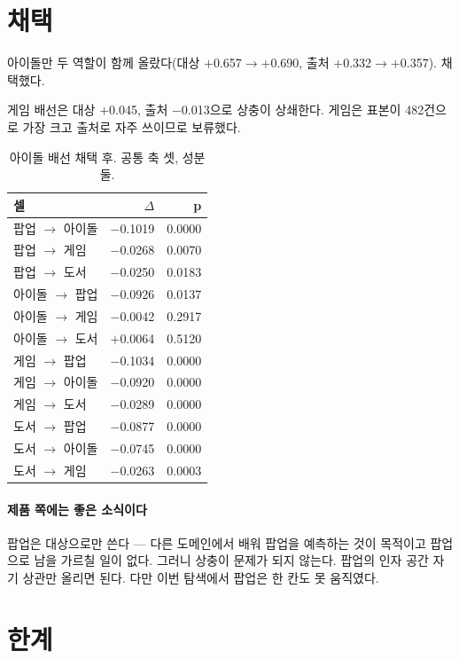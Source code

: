 \documentclass[10pt]{article}
\begin{document}
\section{채택}

아이돌만 두 역할이 함께 올랐다(대상 $+$0.657$\to+$0.690, 출처
$+$0.332$\to+$0.357). 채택했다.

게임 배선은 대상 $+$0.045, 출처 $-$0.013으로 상충이 상쇄한다. 게임은 표본이
482건으로 가장 크고 출처로 자주 쓰이므로 보류했다.

\begin{table}[t]
\centering\tsize
\caption{아이돌 배선 채택 후. 공통 축 셋, 성분 둘.}
\begin{tabular}{lrr}
\toprule
셀 & $\Delta$ & p \\
\midrule
팝업 $\to$ 아이돌 & $-$0.1019 & 0.0000 \\
팝업 $\to$ 게임 & $-$0.0268 & 0.0070 \\
팝업 $\to$ 도서 & $-$0.0250 & 0.0183 \\
아이돌 $\to$ 팝업 & $-$0.0926 & 0.0137 \\
아이돌 $\to$ 게임 & $-$0.0042 & 0.2917 \\
아이돌 $\to$ 도서 & $+$0.0064 & 0.5120 \\
게임 $\to$ 팝업 & $-$0.1034 & 0.0000 \\
게임 $\to$ 아이돌 & $-$0.0920 & 0.0000 \\
게임 $\to$ 도서 & $-$0.0289 & 0.0000 \\
도서 $\to$ 팝업 & $-$0.0877 & 0.0000 \\
도서 $\to$ 아이돌 & $-$0.0745 & 0.0000 \\
도서 $\to$ 게임 & $-$0.0263 & 0.0003 \\
\bottomrule
\end{tabular}
\end{table}

\paragraph{제품 쪽에는 좋은 소식이다}
팝업은 대상으로만 쓴다 --- 다른 도메인에서 배워 팝업을 예측하는 것이 목적이고
팝업으로 남을 가르칠 일이 없다. 그러니 상충이 문제가 되지 않는다. 팝업의 인자
공간 자기 상관만 올리면 된다. 다만 이번 탐색에서 팝업은 한 칸도 못 움직였다.

\section{한계}
\end{document}
